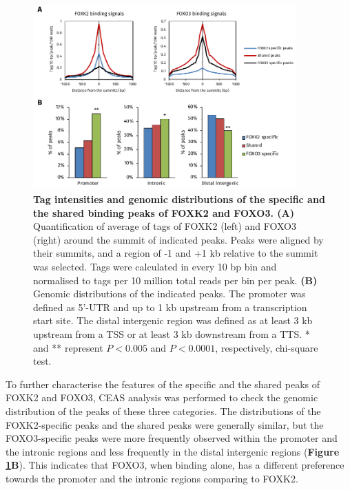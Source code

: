 \begin{figure}[!h]
    \centering
    \includegraphics[width=0.9\textwidth]{chapter3/figures_foxo3/fig43.pdf}
    \caption[Tag intensities and genomic distributions of the specific and the shared binding peaks of FOXK2 and FOXO3]{\textbf{Tag intensities and genomic distributions of the specific and the shared binding peaks of FOXK2 and FOXO3. (A)} Quantification of average of tags of FOXK2 (left) and FOXO3 (right) around the summit of indicated peaks. Peaks were aligned by their summits, and a region of -1 and +1 kb relative to the summit was selected. Tags were calculated in every 10 bp bin and normalised to tags per 10 million total reads per bin per peak. \textbf{(B)} Genomic distributions of the indicated peaks. The promoter was defined as 5'-UTR and up to 1 kb upstream from a transcription start site. The distal intergenic region was defined as at least 3 kb upstream from a TSS or at least 3 kb downstream from a TTS. * and ** represent $P<0.005$ and $P<0.0001$, respectively, chi-square test.}
    \label{fig:fig43}
\end{figure}

To further characterise the features of the specific and the shared peaks of FOXK2 and FOXO3, CEAS analysis was performed to check the genomic distribution of the peaks of these three categories. The distributions of the FOXK2-specific peaks and the shared peaks were generally similar, but the FOXO3-specific peaks were more frequently observed within the promoter and the intronic regions and less frequently in the distal intergenic regions (\textbf{Figure \ref{fig:fig43}B}). This indicates that FOXO3, when binding alone, has a different preference towards the promoter and the intronic regions comparing to FOXK2.

